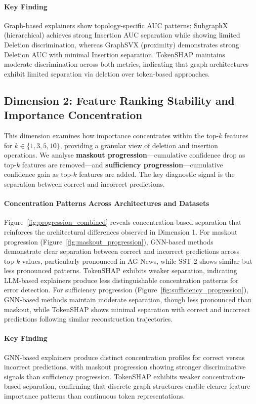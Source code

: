 \documentclass[preprint, times, review, 10pt]{elsarticle}
\begin{document}
\paragraph{\textbf{Key Finding}}
Graph-based explainers show topology-specific AUC patterns: SubgraphX (hierarchical) achieves strong Insertion AUC separation while showing limited Deletion discrimination, whereas GraphSVX (proximity) demonstrates strong Deletion AUC with minimal Insertion separation. TokenSHAP maintains moderate discrimination across both metrics, indicating that graph architectures exhibit limited separation via deletion over token-based approaches.


\subsection{Dimension 2: Feature Ranking Stability and Importance Concentration} \label{sec:dim2}
 
This dimension examines how importance concentrates within the top-$k$ features for $k \in \{1, 3, 5, 10\}$, providing a granular view of deletion and insertion operations. We analyse \textbf{maskout progression}—cumulative confidence drop as top-$k$ features are removed—and \textbf{sufficiency progression}—cumulative confidence gain as top-$k$ features are added. The key diagnostic signal is the separation between correct and incorrect predictions.

\paragraph{Concentration Patterns Across Architectures and Datasets}
Figure~\ref{fig:progression_combined} reveals concentration-based separation that reinforces the architectural differences observed in Dimension 1. For maskout progression (Figure~\ref{fig:maskout_progression}), GNN-based methods demonstrate clear separation between correct and incorrect predictions across top-$k$ values, particularly pronounced in AG News, while SST-2 shows similar but less pronounced patterns. TokenSHAP exhibits weaker separation, indicating LLM-based explainers produce less distinguishable concentration patterns for error detection. For sufficiency progression (Figure~\ref{fig:sufficiency_progression}), GNN-based methods maintain moderate separation, though less pronounced than maskout, while TokenSHAP shows minimal separation with correct and incorrect predictions following similar reconstruction trajectories.

\paragraph{\textbf{Key Finding}}
GNN-based explainers produce distinct concentration profiles for correct versus incorrect predictions, with maskout progression showing stronger discriminative signals than sufficiency progression. TokenSHAP exhibits weaker concentration-based separation, confirming that discrete graph structures enable clearer feature importance patterns than continuous token representations.
\end{document}
